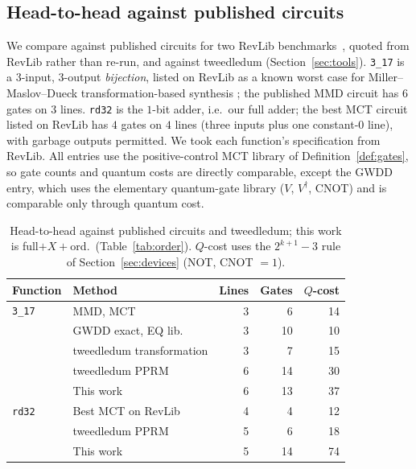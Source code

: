 \documentclass[conference]{IEEEtran}
\theoremstyle{plain}
\begin{document}
\subsection{Head-to-head against published circuits}
\label{sec:head-to-head}
We compare against published circuits for two RevLib
benchmarks~\cite{revlib2008}, quoted from RevLib rather than re-run, and
against tweedledum (Section~\ref{sec:tools}). \texttt{3\_17}
is a $3$-input, $3$-output \emph{bijection}, listed on RevLib as a known
worst case for Miller--Maslov--Dueck transformation-based synthesis
\cite{miller2003}; the published MMD circuit has $6$ gates on $3$ lines.
\texttt{rd32} is the $1$-bit adder, i.e.\ our full adder; the best MCT
circuit listed on RevLib has $4$ gates on $4$ lines (three inputs plus one
constant-$0$ line), with garbage outputs permitted. We took each
function's specification from RevLib. All entries use the
positive-control MCT library of Definition~\ref{def:gates}, so gate counts
and quantum costs are directly comparable, except the GWDD entry, which
uses the elementary quantum-gate library ($V$, $V^\dagger$, CNOT) and is
comparable only through quantum cost.

\begin{table}[t]
\centering
\caption{Head-to-head against published circuits and tweedledum; this
work is full$+X+$ord.\ (Table~\ref{tab:order}). $Q$-cost uses the
$2^{k+1}-3$ rule of Section~\ref{sec:devices} (NOT, CNOT $=1$).}
\label{tab:head2head}
\small
\begin{tabular}{@{}llrrr@{}}
\toprule
Function & Method & Lines & Gates & $Q$-cost\\
\midrule
\texttt{3\_17} & MMD, MCT \cite{miller2003} & 3 & 6 & 14\\
 & GWDD exact, EQ lib.\ \cite{grosse2008} & 3 & 10 & 10\\
 & tweedledum transformation & 3 & 7 & 15\\
 & tweedledum PPRM & 6 & 14 & 30\\
 & This work & 6 & 13 & 37\\
\midrule
\texttt{rd32} & Best MCT on RevLib \cite{revlib2008} & 4 & 4 & 12\\
 & tweedledum PPRM & 5 & 6 & 18\\
 & This work & 5 & 14 & 74\\
\bottomrule
\end{tabular}
\end{table}
\end{document}
